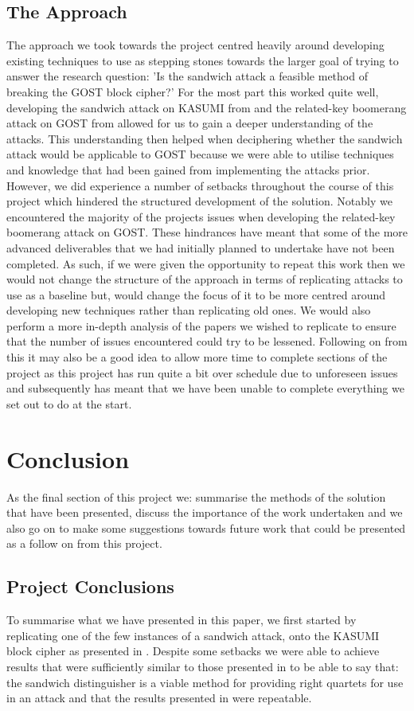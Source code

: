\documentclass[10pt,journal,compsoc]{IEEEtran}
\begin{document}
\subsection{The Approach}
The approach we took towards the project centred heavily around developing existing techniques to use as stepping stones towards the larger goal of trying to answer the research question: 'Is the sandwich attack a feasible method of breaking the GOST block cipher?' For the most part this worked quite well, developing the sandwich attack on KASUMI from \cite{jofc-2014-25962} and the related-key boomerang attack on GOST from \cite{cryptoeprint:2010/111} allowed for us to gain a deeper understanding of the attacks. This understanding then helped when deciphering whether the sandwich attack would be applicable to GOST because we were able to utilise techniques and knowledge that had been gained from implementing the attacks prior. However, we did experience a number of setbacks throughout the course of this project which hindered the structured development of the solution. Notably we encountered the majority of the projects issues when developing the related-key boomerang attack on GOST. These hindrances have meant that some of the more advanced deliverables that we had initially planned to undertake have not been completed. As such, if we were given the opportunity to repeat this work then we would not change the structure of the approach in terms of replicating attacks to use as a baseline but, would change the focus of it to be more centred around developing new techniques rather than replicating old ones. We would also perform a more in-depth analysis of the papers we wished to replicate to ensure that the number of issues encountered could try to be lessened. Following on from this it may also be a good idea to allow more time to complete sections of the project as this project has run quite a bit over schedule due to unforeseen issues and subsequently has meant that we have been unable to complete everything we set out to do at the start.

\section{Conclusion}
As the final section of this project we: summarise the methods of the solution that have been presented, discuss the importance of the work undertaken and we also go on to make some suggestions towards future work that could be presented as a follow on from this project.

\subsection{Project Conclusions}
To summarise what we have presented in this paper, we first started by replicating one of the few instances of a sandwich attack, onto the KASUMI block cipher as presented in \cite{jofc-2014-25962}. Despite some setbacks we were able to achieve results that were sufficiently similar to those presented in \cite{jofc-2014-25962} to be able to say that: the sandwich distinguisher is a viable method for providing right quartets for use in an attack and that the results presented in \cite{jofc-2014-25962} were repeatable.
\end{document}
